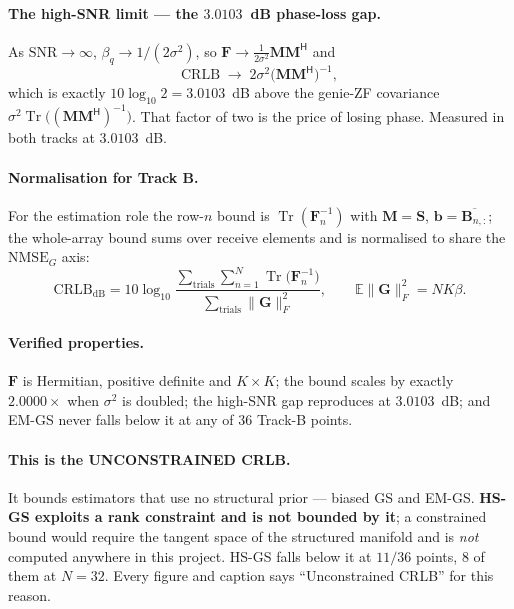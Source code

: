 \documentclass[11pt,a4paper]{article}
\newcommand{\E}{\mathbb{E}}
\newcommand{\herm}{\mathsf{H}}
\newcommand{\mat}[1]{\mathbf{#1}}
\newcommand{\vect}[1]{\mathbf{#1}}
\newcommand{\Tr}{\operatorname{Tr}}
\newcommand{\NMSE}{\mathrm{NMSE}}
\newcommand{\SNR}{\mathrm{SNR}}
\newcommand{\dB}{\mathrm{dB}}
\begin{document}
\paragraph{The high-SNR limit --- the $3.0103$~dB phase-loss gap.}
As $\SNR\to\infty$, $\beta_q\to 1/(2\sigma^2)$, so
$\mat{F}\to\frac{1}{2\sigma^2}\mat{M}\mat{M}^{\herm}$ and
\begin{equation}
\mathrm{CRLB}\;\longrightarrow\;2\sigma^2\bigl(\mat{M}\mat{M}^{\herm}\bigr)^{-1},
\label{eq:crlbhigh}
\end{equation}
which is exactly $10\log_{10}2 = 3.0103$~dB above the genie-ZF covariance
$\sigma^2\Tr\bigl((\mat{M}\mat{M}^{\herm})^{-1}\bigr)$. That factor of two is
the price of losing phase. Measured in both tracks at $3.0103$~dB.

\paragraph{Normalisation for Track B.} For the estimation role the row-$n$
bound is $\Tr(\mat{F}_n^{-1})$ with $\mat{M}=\mat{S}$,
$\vect{b}=\overline{\mat{B}_{n,:}}$; the whole-array bound sums over receive
elements and is normalised to share the $\NMSE_G$ axis:
\begin{equation}
\mathrm{CRLB}_{\dB}
= 10\log_{10}\frac{\sum_{\text{trials}}\sum_{n=1}^{N}\Tr\bigl(\mat{F}_n^{-1}\bigr)}
                  {\sum_{\text{trials}}\|\mat{G}\|_F^2},
\qquad \E\|\mat{G}\|_F^2 = NK\beta .
\label{eq:crlbB}
\end{equation}

\paragraph{Verified properties.} $\mat{F}$ is Hermitian, positive definite and
$K\times K$; the bound scales by exactly $2.0000\times$ when $\sigma^2$ is
doubled; the high-SNR gap reproduces at $3.0103$~dB; and EM-GS never falls
below it at any of $36$ Track-B points.

\paragraph{This is the UNCONSTRAINED CRLB.} It bounds estimators that use no
structural prior --- biased GS and EM-GS. \textbf{HS-GS exploits a rank
constraint and is not bounded by it}; a constrained bound would require the
tangent space of the structured manifold and is \emph{not} computed anywhere
in this project. HS-GS falls below it at $11/36$ points, $8$ of them at
$N=32$. Every figure and caption says ``Unconstrained CRLB'' for this reason.
\end{document}
